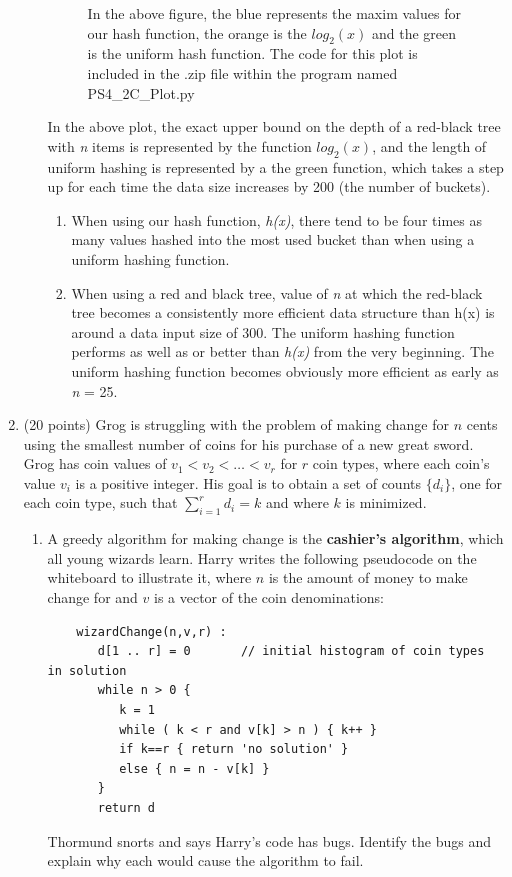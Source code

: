 \documentclass[12pt]{article}
\begin{document}
\begin{enumerate}
\begin{enumerate}
\begin{figure}
    \caption{In the above figure, the blue represents the maxim values for our hash function, the orange is the $log_{2}(x)$ and the green is the uniform hash function. The code for this plot is included in the .zip file within the program named PS4\_2C\_Plot.py}
    \end{figure}

In the above plot, the exact upper bound on the depth of a red-black tree with \textit{n} items is represented by the function $log_{2}(x)$, and the length of uniform hashing is represented by a the green function, which takes a step up for each time the data size increases by 200 (the number of buckets).

\begin{enumerate}
    \item When using our hash function, \textit{h(x)}, there tend to be four times as many values hashed into the most used bucket than when using a uniform hashing function.
    \item When using a red and black tree, value of \textit{n} at which the red-black tree becomes a consistently more efficient data structure than h(x) is around a data input size of 300. The uniform hashing function performs as well as or better than \textit{h(x)} from the very beginning. The uniform hashing function becomes obviously more efficient as early as \textit{n} = 25.
\end{enumerate}
\end{enumerate}

\newpage
	\item (20 points) Grog is struggling with the problem of making change for $n$ cents using the smallest number of coins for his purchase of a new great sword. Grog has coin values of $v_{1}<v_{2}<\dots<v_{r}$ for $r$ coin types, where each coin's value $v_{i}$ is a positive integer. His goal is to obtain a set of counts $\{d_{i}\}$, one for each coin type, such that $\sum_{i=1}^{r}d_{i}=k$ and where $k$ is minimized.
	\begin{enumerate}
	\item A greedy algorithm for making change is the \textbf{cashier's algorithm}, which all young wizards learn. Harry writes the following pseudocode on the whiteboard to illustrate it, where $n$ is the amount of money to make change for and $v$ is a vector of the coin denominations:
	\begin{small}
	\begin{verbatim}
	wizardChange(n,v,r) :
	   d[1 .. r] = 0       // initial histogram of coin types in solution
	   while n > 0 {
	      k = 1
	      while ( k < r and v[k] > n ) { k++ }
	      if k==r { return 'no solution' }
	      else { n = n - v[k] }
	   }
	   return d
	\end{verbatim}
	\end{small}
	Thormund snorts and says Harry's code has bugs. Identify the bugs and explain why each would cause the algorithm to fail.
	

\end{enumerate}
\end{enumerate}
\end{document}

